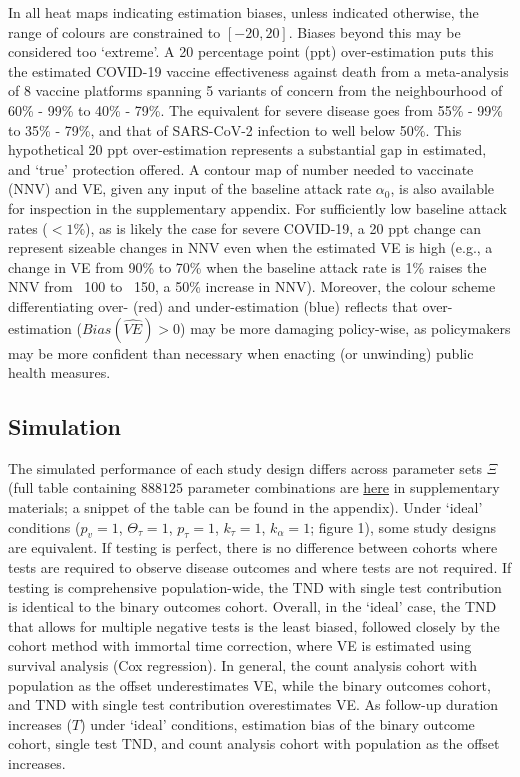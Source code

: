 \documentclass[12pt]{article}
\begin{document}
In all heat maps indicating estimation biases, unless indicated otherwise, the range of colours are constrained to $[-20, 20]$. Biases beyond this may be considered too `extreme'. A 20 percentage point (ppt) over-estimation puts this the estimated COVID-19 vaccine effectiveness against death from a meta-analysis of 8 vaccine platforms spanning 5 variants of concern \citep{higdon2022sysreview} from the neighbourhood of 60\% - 99\% to 40\% - 79\%. The equivalent for severe disease goes from 55\% - 99\% to 35\% - 79\%, and that of SARS-CoV-2 infection to well below 50\%. This hypothetical 20 ppt over-estimation represents a substantial gap in estimated, and `true' protection offered. A contour map of number needed to vaccinate (NNV) and VE, given any input of the baseline attack rate $\alpha_0$, is also available for inspection in the supplementary appendix. For sufficiently low baseline attack rates ($<1\%$), as is likely the case for severe COVID-19, a 20 ppt change can represent sizeable changes in NNV even when the estimated VE is high (e.g., a change in VE from 90\% to 70\% when the baseline attack rate is 1\% raises the NNV from ~100 to ~150, a 50\% increase in NNV). Moreover, the colour scheme differentiating over- (red) and under-estimation (blue) reflects that over-estimation ($Bias(\widehat{VE}) > 0$) may be more damaging policy-wise, as policymakers may be more confident than necessary when enacting (or unwinding) public health measures.

\subsection{Simulation}

The simulated performance of each study design differs across parameter sets $\Xi$ (full table containing $888125$ parameter combinations are \href{https://www.dropbox.com/sh/7sxgwfymrbkexb9/AADc4E3wb-FEsMr7SMIRqH4Ba?dl=0}{here} in supplementary materials; a snippet of the table can be found in the appendix). Under `ideal' conditions ($p_v=1$, $\Theta_{\tau}=1$, $p_{\tau}=1$, $k_{\tau}=1$, $k_{\alpha}=1$; figure 1), some study designs are equivalent. If testing is perfect, there is no difference between cohorts where tests are required to observe disease outcomes and where tests are not required. If testing is comprehensive population-wide, the TND with single test contribution is identical to the binary outcomes cohort. Overall, in the `ideal' case, the TND that allows for multiple negative tests is the least biased, followed closely by the cohort method with immortal time correction, where VE is estimated using survival analysis (Cox regression). In general, the count analysis cohort with population as the offset underestimates VE, while the binary outcomes cohort, and TND with single test contribution overestimates VE. As follow-up duration increases ($T$) under `ideal' conditions, estimation bias of the binary outcome cohort, single test TND, and count analysis cohort with population as the offset increases. 
\end{document}
